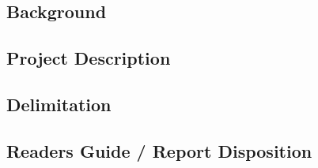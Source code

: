 \documentclass[12pt,twoside]{article}
\begin{document}
\subsection{Background}
\label{section:Background}


\subsection{Project Description}
\label{section:ProjectDescription}

\subsection{Delimitation}
\label{section:Delimitation}

\subsection{Readers Guide / Report Disposition}
\label{section:ReadersGuideReportDisposition}
\end{document}
